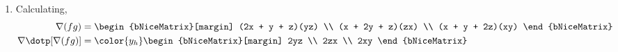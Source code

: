 \begin{enumerate}
    \item Calculating,
          \begin{align}
              \nabla (fg)                & = \begin{bNiceMatrix}[margin]
                                                 (2x + y + z)(yz) \\
                                                 (x + 2y + z)(zx) \\
                                                 (x + y + 2z)(xy)
                                             \end{bNiceMatrix} \\
              \nabla \dotp [\nabla (fg)] & = \color{y_h}
              \begin{bNiceMatrix}[margin]
                  2yz \\ 2zx \\ 2xy
              \end{bNiceMatrix}
          \end{align}
\end{enumerate}